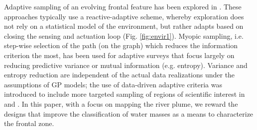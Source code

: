 \documentclass[aoas]{imsart}
\begin{document}





Adaptive sampling of an evolving frontal feature has been explored in
\cite{fronts11,Zhang2012,Pinto2018,costa19}. These approaches
typically use a reactive-adaptive scheme, whereby exploration does not
rely on a statistical model of the environment, but rather adapts
based on closing the sensing and actuation loop
(Fig. \ref{fig:envir1}). Myopic sampling, i.e. step-wise selection of
the path (on the graph) which reduces the information criterion the
most, has been used for adaptive surveys
\citep{singh2009efficient,Binney2013} that focus largely on reducing
predictive variance or mutual information (e.g. entropy). Variance and
entropy reduction are independent of the actual data realizations
under the assumptions of GP models; the use of data-driven adaptive
criteria was introduced to include more targeted sampling of regions
of scientific interest in \cite{Low2009} and \cite{fossuminformation}.
In this paper, with a focus on mapping the river plume, we reward the
designs that improve the classification of water masses as a means to
characterize the frontal zone.
\end{document}
